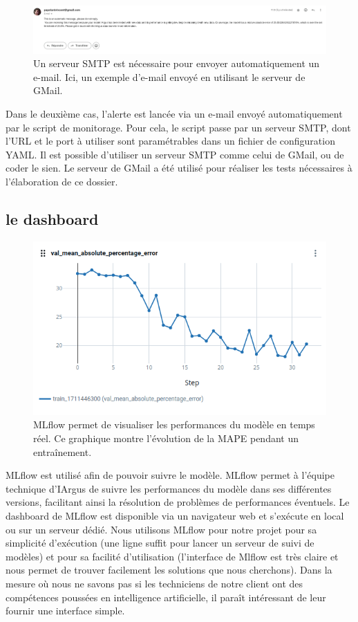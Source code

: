 \documentclass[french]{article}
\begin{document}
    \begin{figure}[h!]
        \includegraphics[width=12cm]{mail}
        \centering
        \caption{Un serveur SMTP est nécessaire pour envoyer automatiquement un e-mail. Ici, un exemple d'e-mail envoyé en utilisant le serveur de GMail.}
    \end{figure}

    Dans le deuxième cas, l'alerte est lancée via un e-mail envoyé automatiquement par le script de monitorage. Pour cela, le script passe par un serveur SMTP, dont l'URL et le port à utiliser sont paramétrables dans un fichier de configuration YAML. Il est possible d'utiliser un serveur SMTP comme celui de GMail, ou de coder le sien. Le serveur de GMail a été utilisé pour réaliser les tests nécessaires à l'élaboration de ce dossier.


    \subsection{le dashboard}

    \begin{figure}[h!]
        \includegraphics[width=12cm]{mlflow}
        \centering
        \caption{MLflow permet de visualiser les performances du modèle en temps réel. Ce graphique montre l'évolution de la MAPE pendant un entraînement.}
    \end{figure}

    MLflow est utilisé afin de pouvoir suivre le modèle. MLflow permet à l'équipe technique d'IArgus de suivre les performances du modèle dans ses différentes versions, facilitant ainsi la résolution de problèmes de performances éventuels. Le dashboard de MLflow est disponible via un navigateur web et s'exécute en local ou sur un serveur dédié. Nous utilisons MLflow pour notre projet pour sa simplicité d'exécution (une ligne suffit pour lancer un serveur de suivi de modèles) et pour sa facilité d'utilisation (l'interface de Mlflow est très claire et nous permet de trouver facilement les solutions que nous cherchons). Dans la mesure où nous ne savons pas si les techniciens de notre client ont des compétences poussées en intelligence artificielle, il paraît intéressant de leur fournir une interface simple.
\end{document}
